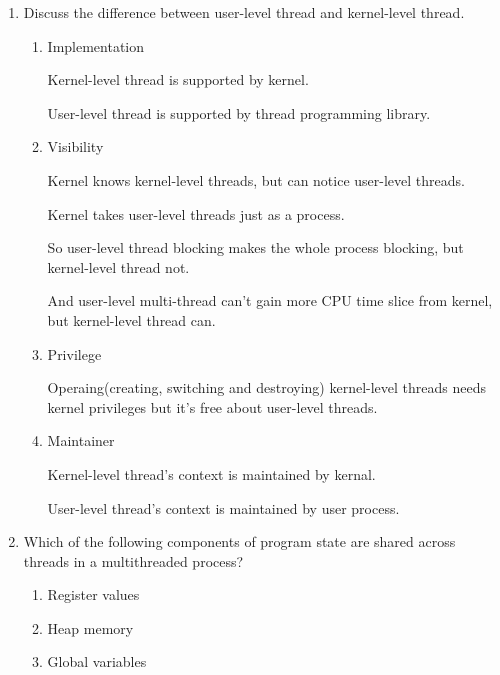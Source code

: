 \begin{enumerate}
    \item Discuss the difference between user-level thread and kernel-level thread.
    
    \begin{enumerate}
        \item Implementation
        
        Kernel-level thread is supported by kernel.
        
        User-level thread is supported by thread programming library.
        
        \item Visibility
        
        Kernel knows kernel-level threads, but can notice user-level threads.
        
        Kernel takes user-level threads just as a process. 
        
        So user-level thread blocking makes the whole process blocking, but kernel-level thread not.
        
        And user-level multi-thread can't gain more CPU time slice from kernel, but kernel-level thread can.
        
        \item Privilege
        
        Operaing(creating, switching and destroying) kernel-level threads needs kernel privileges but it's free about user-level threads.
        
        \item Maintainer
        
        Kernel-level thread's context is maintained by kernal.
        
        User-level thread's context is maintained by user process.
        
    \end{enumerate}


    \item Which of the following components of program state are shared across threads in a multithreaded process?

    \begin{enumerate}
        \item Register values
        
        \item Heap memory
        
        \item Global variables
        

\end{enumerate}
\end{enumerate}
